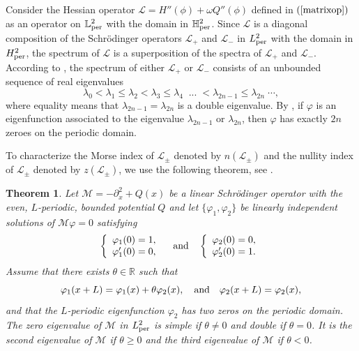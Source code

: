 \documentclass[12pt,reqno]{amsart}
\numberwithin{equation}{section}
\numberwithin{figure}{section}
\newtheorem{theorem}{Theorem}[section]
\begin{document}
Consider the Hessian operator $\mathcal{L} = H''(\phi) + \omega Q''(\phi)$ defined in $(\ref{matrixop})$ as an operator on $\mathbb{L}^2_{\rm per}$ with the domain in $\mathbb{H}^2_{\rm per}$. Since $\mathcal{L}$ is a diagonal composition 
of the Schr\"{o}dinger operators $\mathcal{L}_{+}$ and $\mathcal{L}_{-}$ in $L^2_{\rm per}$ with the domain in $H^2_{\rm per}$, 
the spectrum of $\mathcal{L}$ is a superposition of the spectra 
of $\mathcal{L}_+$ and $\mathcal{L}_-$. According to \cite{Magnus}, 
the spectrum of either $\mathcal{L}_+$ or $\mathcal{L}_-$ consists
of an unbounded sequence of real eigenvalues
		\[
		\lambda_0 < \lambda_1 \leq \lambda_2 < \lambda_3 \leq \lambda_4\;\; ...\; < \lambda_{2n-1} \leq
		\lambda_{2n}\; \cdots, 
		\]
where equality means that $\lambda_{2n-1} = \lambda_{2n}$  is a
double eigenvalue. By \cite[Theorem 3.1.2(ii)]{eastham}, 
if $\varphi$ is an eigenfunction associated to the eigenvalue $\lambda_{2n-1}$ or
$\lambda_{2n}$, then $\varphi$ has exactly $2n$ zeroes on the periodic domain. 

To characterize the Morse index of $\mathcal{L}_{\pm}$ denoted by $n(\mathcal{L}_{\pm})$ and the nullity index of $\mathcal{L}_{\pm}$ denoted by $z(\mathcal{L}_{\pm})$, we use the following theorem, see \cite[Theorem 3.1]{neves}.
		
\begin{theorem}
	\label{teo12}
	Let $\mathcal{M} = -\partial_x^2+Q(x)$ be a linear Schr\"{o}dinger operator with the even, $L$-periodic, bounded potential $Q$ and let $\{ \varphi_1, \varphi_2\}$ be linearly independent solutions of $\mathcal{M} \varphi = 0$ satisfying 
\begin{equation}
\label{ivp}
	\left\{ \begin{array}{l} \varphi_1(0) = 1, \\
	\varphi_1'(0) = 0, \end{array} \right. \quad \mbox{\rm and} \quad 
	\left\{ \begin{array}{l} \varphi_2(0) = 0, \\
\varphi_2'(0) = 1. \end{array} \right.	
\end{equation}
Assume that there exists $\theta \in \mathbb{R}$ such that 
\begin{equation}
\label{theta}
	\varphi_1(x+L) = \varphi_1(x) + \theta \varphi_2(x), \quad 
\mbox{\rm and} \quad  \varphi_2(x+L) = \varphi_2(x), 
\end{equation}
and that the $L$-periodic eigenfunction $\varphi_2$ has two zeros on the periodic domain. The zero eigenvalue of $\mathcal{M}$ in $L^2_{\rm per}$ is simple if $\theta \neq 0$ and double if $\theta = 0$. It is the second eigenvalue of $\mathcal{M}$ if $\theta \geq 0$ and the third eigenvalue of $\mathcal{M}$ if $\theta < 0$. 
\end{theorem}	
\end{document}
